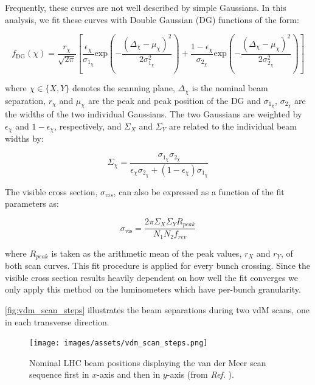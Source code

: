 Frequently, these curves are not well described by simple Gaussians. In this analysis, we fit these curves with Double Gaussian (DG) functions of the form:

\begin{equation}
    f_{\text{DG}}(\chi) = 
    \frac{r_{\chi}}{\sqrt{2\pi}} 
    \left[ 
        \frac{\epsilon_{\chi}}{\sigma_{1_{\chi}}} \text{exp} \left( -\frac{\left( \Delta_{\chi} - \mu_{\chi} \right)^2}{2\sigma^2_{1_{\chi}}} \right) +
        \frac{1 - \epsilon_{\chi}}{\sigma_{2_{\chi}}} \text{exp} \left( -\frac{\left( \Delta_{\chi} - \mu_{\chi} \right)^2}{2\sigma^2_{2_{\chi}}} \right)
    \right]
    \label{eq:double_gaussian_model}
\end{equation}

where $\chi \in \{X, Y\}$ denotes the scanning plane, $\Delta_{\chi}$ is the nominal beam separation, $r_{\chi}$ and $\mu_{\chi}$ are the peak and peak position of the DG and $\sigma_{1_{\chi}}$, $\sigma_{2_{\chi}}$ are the widths of the two individual Gaussians. The two Gaussians are weighted by $\epsilon_{\chi}$ and $1 - \epsilon_{\chi}$, respectively, and $\Sigma_{X}$ and $\Sigma_{Y}$ are related to the individual beam widths by: 

\begin{equation}
    \Sigma_{\chi} = \frac{\sigma_{1_{\chi}}\sigma_{2_{\chi}}}{\epsilon_{\chi}\sigma_{2_{\chi}} + \left( 1 - \epsilon_{\chi}\right) \sigma_{1_{\chi}}}
\end{equation}

The visible cross section, $\sigma_{vis}$, can also be expressed as a function of the fit parameters as:

\begin{equation}
    \sigma_{\mathrm{vis}} =  \frac{2\pi \Sigma_{X} \Sigma_{Y} R_{peak}}{N_1 N_2 f_{rev}}
    \label{eq:calibration_from_fit_parameters}
\end{equation}

where $R_{peak}$ is taken as the arithmetic mean of the peak values, $r_X$ and $r_Y$, of both scan curves. This fit procedure is applied for every bunch crossing. Since the visible cross section results heavily dependent on how well the fit converges we only apply this method on the luminometers which have per-bunch granularity.

\autoref{fig:vdm_scan_steps} illustrates the beam separations during two vdM scans, one in each transverse direction.

\begin{figure}[!htb]
	\centering
	\texttt{[image: images/assets/vdm\_scan\_steps.png]}
	\caption[Example vdM scan sequence positions]{Nominal LHC beam positions displaying the van der Meer scan sequence first in $x$-axis and then in $y$-axis (from \textit{Ref.} \cite{Saariokari:2826125}).}
	\label{fig:vdm_scan_steps}
\end{figure}

